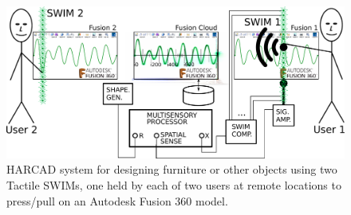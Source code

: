 \documentclass{sigchi-ext}
\begin{document}
\begin{marginfigure}[-20pc]
\begin{minipage}{\marginparwidth}
    \centering
    \caption{
           {\bf Furniture design with Haptic Augmented Reality
                CAD/CAM}.
           A shape synthesizer generates shape information which is
           visualized in alignment with haptic sensation, so shapes can
           be seen and felt in perfect alignment.
           A 3D (3-dimensional) wireless position sensor comprises
           transducers with phase-coherent detection.
Ultimately we bypass CAD altogether to directly and collaboratively
interact with the manufacturing process.  That's what we call
``undigital cyborg craft''.
            }
    \label{fig:wavetable}
  \end{minipage}
\end{marginfigure}

\begin{figure}
  \includegraphics[width=\linewidth]{fig2tei.pdf}
  \caption{
           HARCAD system for designing furniture or other objects using
           two Tactile SWIMs, one held by each of two users at remote locations
           to press/pull on an Autodesk Fusion 360 model.
          }
  \label{fig:tswims}
\end{figure}
\end{document}
